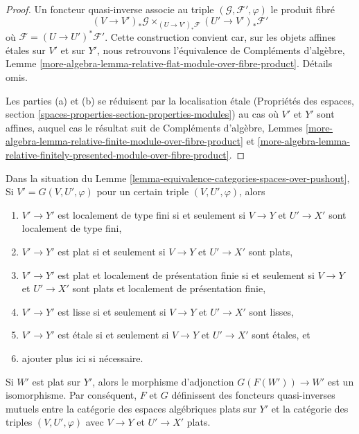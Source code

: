 \begin{proof}
Un foncteur quasi-inverse associe au triple
$(\mathcal{G}, \mathcal{F}', \varphi)$ le produit fibré
$$
(V \to V')_*\mathcal{G}
\times_{(U \to V')_*\mathcal{F}}
(U' \to V')_*\mathcal{F}'
$$
où $\mathcal{F} = (U \to U')^*\mathcal{F}'$. Cette construction convient car, sur
les objets affines \'etales sur $V'$ et sur $Y'$, nous retrouvons l'équivalence de
Compléments d'algèbre, Lemme
\ref{more-algebra-lemma-relative-flat-module-over-fibre-product}.
Détails omis.

\medskip\noindent
Les parties (a) et (b) se réduisent par la localisation \'etale
(Propriétés des espaces, section
\ref{spaces-properties-section-properties-modules})
au cas où $V'$ et $Y'$ sont affines, auquel cas le résultat
suit de
Compléments d'algèbre, Lemmes
\ref{more-algebra-lemma-relative-finite-module-over-fibre-product} et
\ref{more-algebra-lemma-relative-finitely-presented-module-over-fibre-product}.
\end{proof}


\begin{lemma}
\label{lemma-equivalence-categories-spaces-pushout-flat}
Dans la situation du
Lemme \ref{lemma-equivalence-categories-spaces-over-pushout},
Si $V' = G(V, U', \varphi)$ pour un certain triple $(V, U', \varphi)$, alors
\begin{enumerate}
\item $V' \to Y'$ est localement de type fini si et seulement si $V \to Y$ et
$U' \to X'$ sont localement de type fini,
\item $V' \to Y'$ est plat si et seulement si $V \to Y$ et $U' \to X'$ sont plats,
\item $V' \to Y'$ est plat et localement de présentation finie si et seulement si
$V \to Y$ et $U' \to X'$ sont plats et localement de présentation finie,
\item $V' \to Y'$ est lisse si et seulement si $V \to Y$ et $U' \to X'$ sont lisses,
\item $V' \to Y'$ est \'etale si et seulement si $V \to Y$ et $U' \to X'$
sont \'etales, et
\item ajouter plus ici si nécessaire.
\end{enumerate}
Si $W'$ est plat sur $Y'$, alors le morphisme d'adjonction $G(F(W')) \to W'$ est un isomorphisme. Par conséquent, $F$ et $G$ définissent des foncteurs quasi-inverses mutuels entre la catégorie des espaces algébriques plats sur $Y'$ et la catégorie des triples $(V, U', \varphi)$ avec $V \to Y$ et $U' \to X'$ plats. 
\end{lemma}

